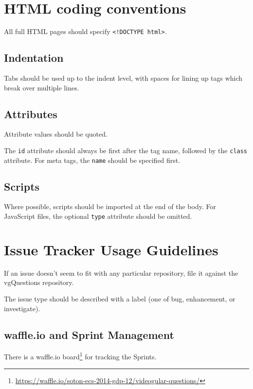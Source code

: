 \section{HTML coding conventions}

All full HTML pages should specify
\texttt{\textless{}!DOCTYPE html\textgreater{}}.

\subsection{Indentation}

Tabs should be used up to the indent level, with spaces for lining up
tags which break over multiple lines.

\subsection{Attributes}

Attribute values should be quoted.

The \texttt{id} attribute should always be first after the tag name,
followed by the \texttt{class} attribute. For meta tags, the
\texttt{name} should be specified first.

\subsection{Scripts}

Where possible, scripts should be imported at the end of the body. For
JavaScript files, the optional \texttt{type} attribute should be
omitted.

\section{Issue Tracker Usage Guidelines}

If an issue doesn't seem to fit with any particular repository, file it
against the \gls{vgQuestions} repository.

The issue type should be described with a label (one of bug,
enhancement, or investigate).

\subsection{waffle.io and Sprint Management}

There is a waffle.io board\footnote{\url{https://waffle.io/soton-ecs-2014-gdp-12/videogular-questions/}}
for tracking the Sprints.


